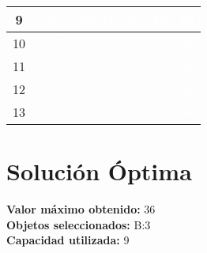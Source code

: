 \documentclass{article}
\begin{document}
\begin{center}
\begin{tabular}{|c|c|c|c|c|c|}
9 & \cellcolor{rojo}\textcolor{white}{0} & \cellcolor{verde}\textcolor{white}{36(3)} & \cellcolor{rojo}\textcolor{white}{36} & \cellcolor{rojo}\textcolor{white}{36} & \cellcolor{rojo}\textcolor{white}{36} \\ \hline
10 & \cellcolor{verde}\textcolor{white}{20(1)} & \cellcolor{verde}\textcolor{white}{36(3)} & \cellcolor{rojo}\textcolor{white}{36} & \cellcolor{rojo}\textcolor{white}{36} & \cellcolor{rojo}\textcolor{white}{36} \\ \hline
11 & \cellcolor{verde}\textcolor{white}{20(1)} & \cellcolor{verde}\textcolor{white}{36(3)} & \cellcolor{rojo}\textcolor{white}{36} & \cellcolor{rojo}\textcolor{white}{36} & \cellcolor{rojo}\textcolor{white}{36} \\ \hline
12 & \cellcolor{verde}\textcolor{white}{20(1)} & \cellcolor{verde}\textcolor{white}{36(3)} & \cellcolor{rojo}\textcolor{white}{36} & \cellcolor{rojo}\textcolor{white}{36} & \cellcolor{rojo}\textcolor{white}{36} \\ \hline
13 & \cellcolor{verde}\textcolor{white}{20(1)} & \cellcolor{verde}\textcolor{white}{36(3)} & \cellcolor{rojo}\textcolor{white}{36} & \cellcolor{rojo}\textcolor{white}{36} & \cellcolor{rojo}\textcolor{white}{36} \\ \hline
\end{tabular}
\end{center}
\normalsize

\section*{Solución Óptima}
\textbf{Valor máximo obtenido:} 36\\
\textbf{Objetos seleccionados:} B:3\\
\textbf{Capacidad utilizada:} 9\\
\end{document}
